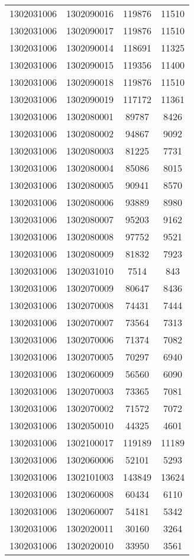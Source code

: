 \begin{longtable}{llcc}
1302031006 & 1302090016 & 119876 & 11510\\
1302031006 & 1302090017 & 119876 & 11510\\
1302031006 & 1302090014 & 118691 & 11325\\
1302031006 & 1302090015 & 119356 & 11400\\
1302031006 & 1302090018 & 119876 & 11510\\
1302031006 & 1302090019 & 117172 & 11361\\
1302031006 & 1302080001 & 89787 & 8426\\
1302031006 & 1302080002 & 94867 & 9092\\
1302031006 & 1302080003 & 81225 & 7731\\
1302031006 & 1302080004 & 85086 & 8015\\
1302031006 & 1302080005 & 90941 & 8570\\
1302031006 & 1302080006 & 93889 & 8980\\
1302031006 & 1302080007 & 95203 & 9162\\
1302031006 & 1302080008 & 97752 & 9521\\
1302031006 & 1302080009 & 81832 & 7923\\
1302031006 & 1302031010 & 7514 & 843\\
1302031006 & 1302070009 & 80647 & 8436\\
1302031006 & 1302070008 & 74431 & 7444\\
1302031006 & 1302070007 & 73564 & 7313\\
1302031006 & 1302070006 & 71374 & 7082\\
1302031006 & 1302070005 & 70297 & 6940\\
1302031006 & 1302060009 & 56560 & 6090\\
1302031006 & 1302070003 & 73365 & 7081\\
1302031006 & 1302070002 & 71572 & 7072\\
1302031006 & 1302050010 & 44325 & 4601\\
1302031006 & 1302100017 & 119189 & 11189\\
1302031006 & 1302060006 & 52101 & 5293\\
1302031006 & 1302101003 & 143849 & 13624\\
1302031006 & 1302060008 & 60434 & 6110\\
1302031006 & 1302060007 & 54181 & 5342\\
1302031006 & 1302020011 & 30160 & 3264\\
1302031006 & 1302020010 & 33950 & 3561\\

\end{longtable}
